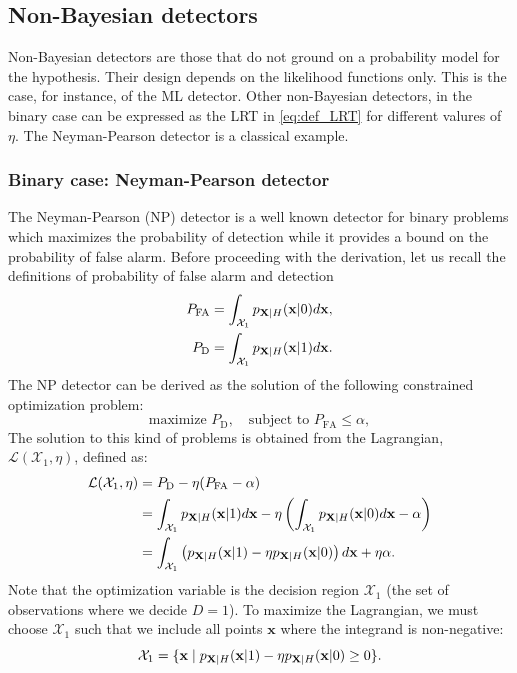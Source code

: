 \subsection{Non-Bayesian detectors}

Non-Bayesian detectors are those that do not ground on a probability model for the hypothesis. Their design depends on the likelihood functions only. This is the case, for instance, of the ML detector. Other non-Bayesian detectors, in the binary case can be expressed as the LRT in \eqref{eq:def_LRT} for different valures of $\eta$. The Neyman-Pearson detector is a classical example.


\subsubsection{Binary case: Neyman-Pearson detector}

The Neyman-Pearson (NP) detector is a well known detector for binary problems which maximizes the probability of detection while it provides a bound on the probability of false alarm. Before proceeding with the derivation, let us recall the definitions of probability of false alarm and detection
\begin{align}
P_{\text{FA}}  & = \int_{{\cal X}_1} p_{{\bf X}|H}({\bf x}|0) d{\bf x}, \nonumber \\
P_{\text{D}} & = \int_{{\cal X}_1} p_{{\bf X}|H}({\bf x}|1) d{\bf x}. \nonumber
\end{align}
The NP detector can be derived as the solution of the following constrained optimization problem:
\begin{equation*}
\text{maximize } P_\text{D}, \quad \text{subject to } P_\text{FA} \le \alpha,
\end{equation*}
The solution to this kind of problems is obtained from the Lagrangian, $\mathcal{L}(\mathcal{X}_1, \eta)$, defined as:
\begin{align}
\mathcal{L}(\mathcal{X}_1, \eta) 
	&= P_{\text{D}} - \eta (P_{\text{FA}} - \alpha) \nonumber \\
    &= \int_{\mathcal{X}_1} p_{{\mathbf X}|H}({\mathbf x} |1) d{\mathbf x} 
     - \eta \left( \int_{\mathcal{X}_1} p_{{\mathbf X}|H}({\mathbf x} |0) d{\mathbf x} - \alpha \right)    
    \nonumber \\
    &= \int_{\mathcal{X}_1} \left(p_{{\mathbf X}|H}({\mathbf x}|1) - \eta p_{{\mathbf X}|H}({\mathbf x}|0) \right) d{\mathbf x} 
     + \eta \alpha.
\end{align}
Note that the optimization variable is the decision region $\mathcal{X}_1$ (the set of observations where we decide $D=1$). To maximize the Lagrangian, we must choose $\mathcal{X}_1$ such that we include all points $\mathbf{x}$ where the integrand is non-negative:
\begin{equation*}
\mathcal{X}_1 
	= \{ {\mathbf x} \mid p_{{\mathbf X}|H}({\mathbf x}|1) - \eta p_{{\mathbf X}|H}({\mathbf x}|0) \geq 0 \}.
\end{equation*}

